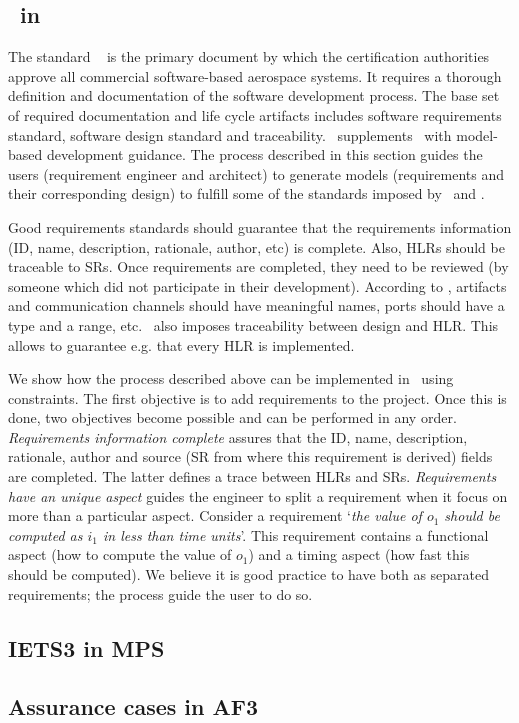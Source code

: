 
\subsection{\doone\ in \afthree}

The standard \doone~\cite{do178c} is the primary document by which the certification authorities approve all commercial software-based aerospace systems.
It requires a thorough definition and documentation of the software development process. 
The base set of required documentation and life cycle artifacts includes software requirements standard, software design standard and traceability.
\dothree\ supplements \doone\ with model-based development guidance.
The process described in this section guides the users (requirement engineer and architect) to generate models (requirements and their corresponding design) to fulfill some of the standards imposed by \doone\ and \dothree.

Good requirements standards should guarantee that the requirements information (ID, name, description, rationale, author, etc) is complete.
Also, HLRs should be traceable to SRs.
Once requirements are completed, they need to be reviewed (by someone which did not participate in their development).
According to \dothree, artifacts and communication channels should have meaningful names, ports should have a type and a range, etc.
\doone\ also imposes traceability between design and HLR.
This allows to guarantee e.g. that every HLR is implemented.

We show how the process described above can be implemented in \afthree\ using constraints.
The first objective is to add requirements to the project. 
Once this is done, two objectives become possible and can be performed in any order. 
\emph{Requirements information complete} assures that the ID, name, description, rationale, author and source (SR from where this requirement is derived) fields are completed. 
The latter defines a trace between HLRs and SRs.
\emph{Requirements have an unique aspect} guides the engineer to split a requirement when it focus on more than a particular aspect.
Consider a requirement `\emph{the value of $o_1$ should be computed as $i_1$ in less than time units}'.
This requirement contains a functional aspect (how to compute the value of $o_1$) and a timing aspect (how fast this should be computed).
We believe it is good practice to have both as separated requirements; the process guide the user to do so.

\subsection{IETS3 in MPS}
\label{sec:meta}


\subsection{Assurance cases in AF3}
